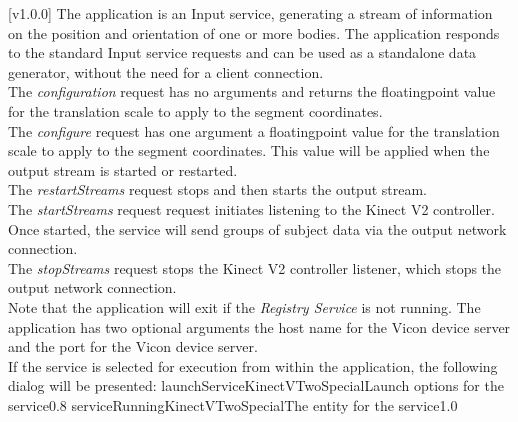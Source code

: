 [v1.0.0]
The  application is an Input service,
generating a stream of information on the position and orientation of one or more bodies.
The application responds to the standard Input service requests and can be used as a
standalone data generator, without the need for a client connection.\\

The \emph{configuration} request has no arguments and returns the floating\longDash{}point
value for the translation scale to apply to the segment coordinates.\\

The \emph{configure} request has one argument \longDash{} a floating\longDash{}point
value for the translation scale to apply to the segment coordinates.
This value will be applied when the output stream is started or restarted.\\ 

The \emph{restartStreams} request stops and then starts the output stream.\\

The \emph{startStreams} request request initiates listening to the Kinect V2 controller.
Once started, the service will send groups of subject data via the output \yarp{} network
connection.\\

The \emph{stopStreams} request stops the Kinect V2 controller listener, which stops the
output \yarp{} network connection.\\ 

Note that the application will exit if the \emph{Registry Service} is not running.
The application has two optional arguments \longDash{} the host name for the Vicon device
server and the port for the Vicon device server.
\insertAppParameters
\condPage
\insertTagDescription{\KVtwoSI}
\insertInputServiceComment\\

\insertStandardServiceCommands
\secondaryEnd
{}
If the service is selected for execution from within the \emph{\MMMU} application, the
following dialog will be presented:
%
{launchServiceKinectVTwoSpecial}{Launch options for the \KVtwoSI{} service}{0.8}
\condPage
{}%
{serviceRunningKinectVTwoSpecial}{The \emph{\MMMU} entity for the \KVtwoSI{} service}{1.0}
\secondaryEnd
\primaryEnd{}
